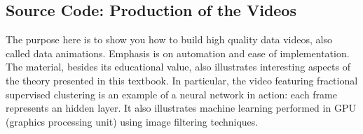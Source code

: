 \documentclass[10pt]{article}
\begin{document}
\subsection{Source Code: Production of the Videos}\label{visusc}

The purpose here is to show you how to build high quality data videos, also called data animations. Emphasis is on automation and ease of implementation.
The material, besides its educational value, also illustrates interesting aspects of the theory presented in this textbook. In particular, the video featuring
fractional supervised clustering is an example of a neural network in action: each frame represents an hidden layer. It also illustrates machine learning performed in GPU (graphics processing unit) using image filtering techniques.
\end{document}
